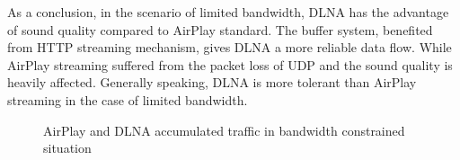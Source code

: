 As a conclusion, in the scenario of limited bandwidth, DLNA has the advantage
of sound quality compared to AirPlay standard. The buffer system, benefited from HTTP streaming mechanism, gives DLNA a more reliable data flow. While AirPlay streaming suffered from the packet loss of UDP and the sound quality is heavily affected. Generally speaking, DLNA is more tolerant than AirPlay streaming in the case of limited bandwidth. \begin{figure}[hb]%
\caption{AirPlay and DLNA accumulated traffic in
bandwidth constrained situation\label{all_traffic_bw}}
\end{figure}
